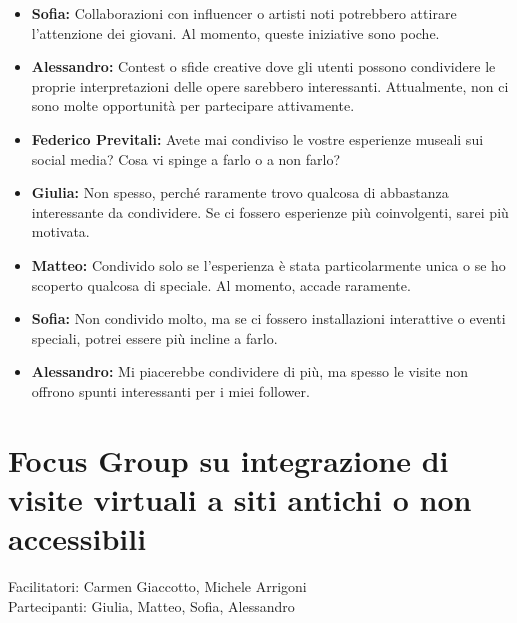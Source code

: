 \documentclass{article}
\begin{document}
\begin{itemize}
\item \textbf{Sofia:} Collaborazioni con influencer o artisti noti potrebbero attirare l’attenzione dei giovani. Al momento, queste iniziative sono poche.

\item \textbf{Alessandro:} Contest o sfide creative dove gli utenti possono condividere le proprie interpretazioni delle opere sarebbero interessanti. Attualmente, non ci sono molte opportunità per partecipare attivamente.

\item \textbf{Federico Previtali:} Avete mai condiviso le vostre esperienze museali sui social media? Cosa vi spinge a farlo o a non farlo?

\item \textbf{Giulia:} Non spesso, perché raramente trovo qualcosa di abbastanza interessante da condividere. Se ci fossero esperienze più coinvolgenti, sarei più motivata.

\item \textbf{Matteo:} Condivido solo se l’esperienza è stata particolarmente unica o se ho scoperto qualcosa di speciale. Al momento, accade raramente.

\item \textbf{Sofia:} Non condivido molto, ma se ci fossero installazioni interattive o eventi speciali, potrei essere più incline a farlo.

\item \textbf{Alessandro:} Mi piacerebbe condividere di più, ma spesso le visite non offrono spunti interessanti per i miei follower.

\end{itemize}

\section{Focus Group su integrazione di visite virtuali a siti antichi o non accessibili} 
Facilitatori: Carmen Giaccotto, Michele Arrigoni \\
Partecipanti: Giulia, Matteo, Sofia, Alessandro
\end{document}
